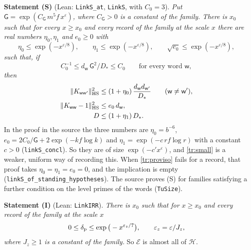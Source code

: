 \documentclass[11pt,letterpaper]{article}
\begin{document}
\textbf{Statement (S)} (Lean: \texttt{LinkS\_at}, \texttt{LinkS}, with $C_0=3$). \emph{Put
$\mathsf G=\exp(C_{\mathsf G}\,m^5f\,x^{\varepsilon})$, where $C_{\mathsf G}>0$ is a constant of the family. There is
$x_0$ such that for every $x\ge x_0$ and every record of the family at the scale $x$ there are real numbers
$\eta_0,\eta_1$ and $e_0\ge0$ with}
\begin{equation}\label{tr:small}
 \eta_0\le \exp(-x^{\varepsilon/8}),\qquad \eta_1\le \exp(-x^{\varepsilon/8}),\qquad \sqrt{e_0}\le \exp(-x^{\varepsilon/8}),
\end{equation}
\emph{such that, if}
\begin{equation}\label{tr:proviso}
 C_0^{-1}\le d_{\mathsf w}\,\mathsf G^2/D_*\le C_0\qquad\text{for every word }\mathsf w,
\end{equation}
\emph{then}
\begin{align}
 \|K_{\mathsf w\mathsf w'}\|_{\rm HS}^2&\le(1+\eta_0)\,\frac{d_{\mathsf w}d_{\mathsf w'}}{D_*}
   \qquad(\mathsf w\ne\mathsf w'),\label{tr:S1}\\
 \|K_{\mathsf w\mathsf w}-1\|_{\rm HS}^2&\le e_0\,d_{\mathsf w},\label{tr:S2}\\
 D&\le(1+\eta_1)\,D_*.\label{tr:S3}
\end{align}
In the proof in the source the three numbers are
$\eta_0=b^{-6}$, $e_0=2C_0/\mathsf G+2\exp(-kf\log k)$ and $\eta_1=\exp(-c\,rf\log r)$ with a constant $c>0$
(\texttt{linkS\_concl}). So they are of size $\exp(-c'x^{\varepsilon})$, and \eqref{tr:small} is a weaker,
uniform way of recording this. When \eqref{tr:proviso} fails for a record, that proof takes
$\eta_0=\eta_1=e_0=0$, and the implication is empty (\texttt{linkS\_of\_standing\_hypotheses}). The source
proves (S) for families satisfying a further condition on the level primes of the words (\texttt{TuSize}).

\textbf{Statement (I)} (Lean: \texttt{LinkIRR}). \emph{There is $x_0$ such that for $x\ge x_0$ and every record
of the family at the scale $x$}
\begin{equation}\label{tr:I}
 0\le\delta_{\rm p}\le\exp\big(-x^{\varepsilon_z/7}\big),\qquad \varepsilon_z=\varepsilon/J_z,
\end{equation}
\emph{where $J_z\ge1$ is a constant of the family.} So $\mathcal E$ is almost all of $\mathcal H$.
\end{document}
